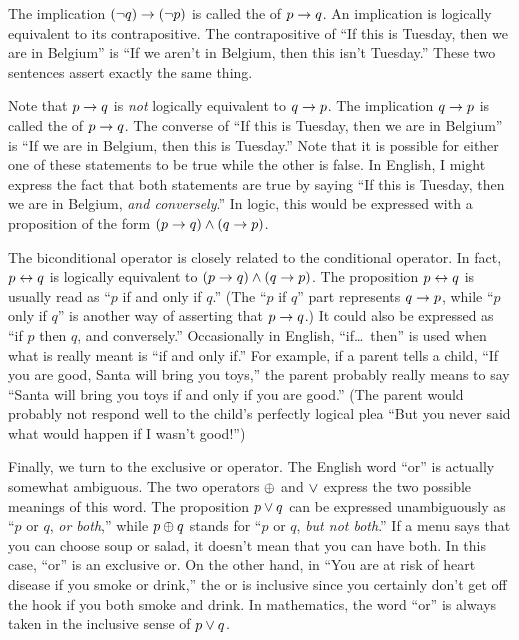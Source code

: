 The implication $(\lnot q)\rightarrow(\lnot p)$ is called the 
of $p\rightarrow q$.  An implication is logically equivalent
to its contrapositive.  The contrapositive of ``If this is Tuesday,
then we are in Belgium'' is ``If we aren't in Belgium, then this
isn't Tuesday.''  These two sentences assert exactly the same
thing.

Note that $p\rightarrow q$ is \emph{not} logically equivalent to
$q\rightarrow p$.  The implication $q\rightarrow p$ is called the
 of $p\rightarrow q$.  The converse of ``If this is
Tuesday, then we are in Belgium'' is ``If we are in Belgium,
then this is Tuesday.''  Note that it is possible for either
one of these statements to be true while the other is false.
In English, I might express the fact that both
statements are true by saying ``If this is Tuesday, then we are
in Belgium, \emph{and conversely}.''  In logic, this would be expressed
with a proposition of the form $(p\rightarrow q)\wedge(q\rightarrow p)$.

The biconditional operator is closely related to the
conditional operator.  In fact, $p\leftrightarrow q$ is logically
equivalent to $(p\rightarrow q)\wedge (q\rightarrow p)$.
The proposition $p\leftrightarrow q$ is usually read as ``$p$ if and only if $q$.''
(The ``$p$ if $q$'' part represents $q\rightarrow p$, while ``$p$ only if $q$''
is another way of asserting that $p\rightarrow q$.) 
It could also be expressed as ``if $p$ then $q$, and conversely.''
Occasionally in English, ``if\dots~then'' is used when what is
really meant is ``if and only if.''  For example, if a parent tells
a child, ``If you are good, Santa will bring you toys,''
the parent probably really means to say ``Santa will bring you toys
if and only if you are good.''  (The parent would probably not
respond well to the child's perfectly logical plea ``But you never said
what would happen if I wasn't good!'')

Finally, we turn to the exclusive or operator.  The English word
``or'' is actually somewhat ambiguous.  The two operators $\oplus$
and $\vee$ express the two possible meanings of this word.
The proposition $p\vee q$ can be expressed unambiguously as
``$p$ or $q$, \emph{or both},'' while $p\oplus q$ stands for
``$p$ or $q$, \emph{but not both}.''  If a menu says that you can
choose soup or salad, it doesn't mean that you can have both.  In
this case, ``or'' is an exclusive or.  On the other hand, in
``You are at risk of heart disease if you smoke or drink,'' the
or is inclusive since you certainly don't get off the hook if you
both smoke and drink.  In mathematics, the word ``or'' is always
taken in the inclusive sense of $p\vee q$.

